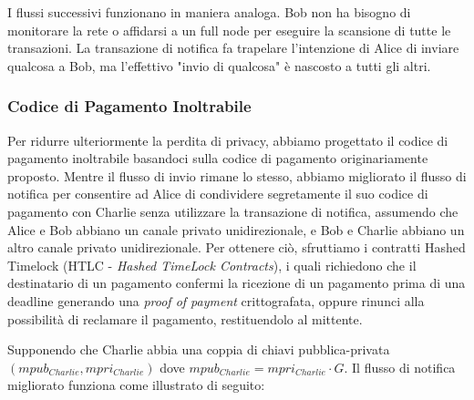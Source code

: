 I flussi successivi funzionano in maniera analoga.
Bob non ha bisogno di monitorare la rete o affidarsi a un full node per eseguire la scansione di tutte le transazioni. La transazione di notifica fa trapelare l'intenzione di Alice di inviare qualcosa a
Bob, ma l'effettivo "invio di qualcosa" è nascosto a tutti gli altri.

\subsubsection{Codice di Pagamento Inoltrabile}
Per ridurre ulteriormente la perdita di privacy, abbiamo progettato il codice di pagamento inoltrabile basandoci sulla codice di pagamento originariamente proposto. Mentre il flusso di invio rimane lo stesso, abbiamo migliorato il flusso di notifica per consentire ad Alice di condividere segretamente il suo codice di pagamento con Charlie senza utilizzare la transazione di notifica, assumendo che Alice e Bob abbiano un canale privato unidirezionale, e Bob e Charlie abbiano un altro
canale privato unidirezionale. Per ottenere ciò, sfruttiamo i contratti Hashed Timelock (HTLC - \emph{Hashed TimeLock Contracts}), i quali richiedono che il destinatario di un pagamento confermi la ricezione di un pagamento prima di una deadline generando una \emph{proof of payment} crittografata, oppure rinunci alla possibilità di reclamare il pagamento, restituendolo al mittente.


Supponendo che Charlie abbia una coppia di chiavi pubblica-privata $(mpub_{Charlie}, mpri_{Charlie})$ dove $mpub_{Charlie} = mpri_{Charlie}\cdot G$. Il flusso di notifica migliorato funziona come illustrato di seguito:

